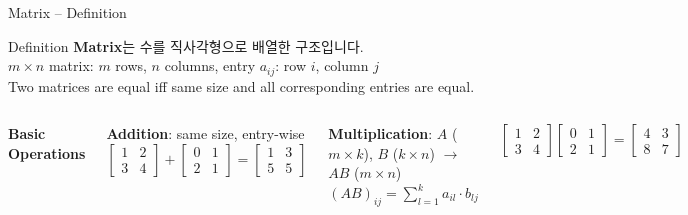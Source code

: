 \documentclass{beamer}
\begin{document}
\begin{frame}[t,shrink=3]{Matrix -- Definition}
    \small
    \vspace{0.1cm}
    \begin{block}{Definition}
        \textbf{Matrix}는 수를 직사각형으로 배열한 구조입니다.\\[3pt]
        \footnotesize $m \times n$ matrix: $m$ rows, $n$ columns, \; entry $a_{ij}$: row $i$, column $j$\\[3pt]
        Two matrices are equal iff same size and all corresponding entries are equal.
    \end{block}

    \vspace{0.1cm}
    \begin{columns}[T]
        \textbf{Basic Operations}
        \vspace{0.05cm}

        \footnotesize
        \textbf{Addition}: same size, entry-wise\\[3pt]
        $\begin{bmatrix} 1 & 2 \\ 3 & 4 \end{bmatrix} + \begin{bmatrix} 0 & 1 \\ 2 & 1 \end{bmatrix} = \begin{bmatrix} 1 & 3 \\ 5 & 5 \end{bmatrix}$

        \vspace{0.15cm}
        \textbf{Multiplication}: $A$ ($m \times k$), $B$ ($k \times n$) $\to$ $AB$ ($m \times n$)\\[3pt]
        $(AB)_{ij} = \displaystyle\sum_{l=1}^{k} a_{il} \cdot b_{lj}$

        \vspace{0.1cm}
        $\begin{bmatrix}1&2\\3&4\end{bmatrix}\begin{bmatrix}0&1\\2&1\end{bmatrix} = \begin{bmatrix}4&3\\8&7\end{bmatrix}$


\end{columns}
\end{frame}
\end{document}
